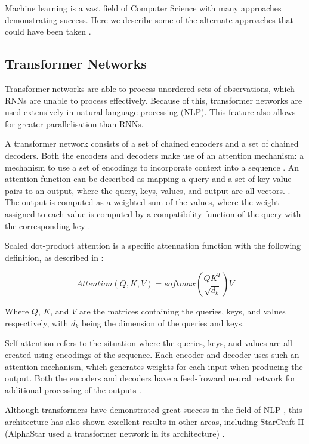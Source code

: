 Machine learning is a vast field of Computer Science with many approaches demonstrating success. Here we describe some of the alternate approaches that could have been taken .

\subsection{Transformer Networks}

Transformer networks are able to process unordered sets of observations, which RNNs are unable to process effectively. Because of this, transformer networks are used extensively in natural language processing (NLP). This feature also allows for greater parallelisation than RNNs.

A transformer network consists of a set of chained encoders and a set of chained decoders. Both the encoders and decoders make use of an attention mechanism: a mechanism to use a set of encodings to incorporate context into a sequence \cite{illustratedtransformer}. An attention function can be described as mapping a query and a set of key-value pairs to an output, where the query, keys, values, and output are all vectors. \cite{attention}. The output is computed as a weighted sum of the values, where the weight assigned to each value is computed by a compatibility function of the query with the corresponding key \cite{attention}.

Scaled dot-product attention is a specific attenuation function with the following definition, as described in \cite{attention}:

\[
Attention(Q,K,V)=softmax(\frac{QK^T}{\sqrt{d_k}})V
\]

Where $Q$, $K$, and $V$ are the matrices containing the queries, keys, and values respectively, with $d_k$ being the dimension of the queries and keys.

Self-attention refers to the situation where the queries, keys, and values are all created using encodings of the sequence. Each encoder and decoder uses such an attention mechanism, which generates weights for each input when producing the output. Both the encoders and decoders have a feed-froward neural network for additional processing of the outputs \cite{illustratedtransformer}.

Although transformers have demonstrated great success in the field of NLP \cite{attention}, this architecture has also shown excellent results in other areas, including StarCraft II (AlphaStar used a transformer network in its architecture) \cite{alphastar}.

